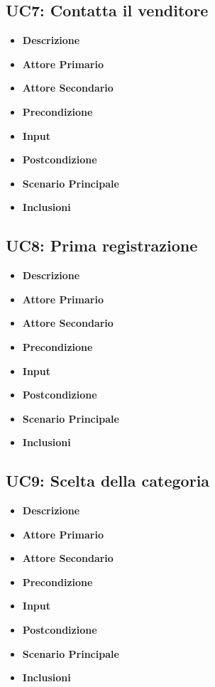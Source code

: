         \subsection{UC7: Contatta il venditore}
        \begin{itemize}
            \item \textbf{Descrizione}
            \item \textbf{Attore Primario}
            \item \textbf{Attore Secondario}
            \item \textbf{Precondizione}
            \item \textbf{Input}
            \item \textbf{Postcondizione}
            \item \textbf{Scenario Principale}
            \item \textbf{Inclusioni}
        \end{itemize}
        \subsection{UC8: Prima registrazione}
        \begin{itemize}
            \item \textbf{Descrizione}
            \item \textbf{Attore Primario}
            \item \textbf{Attore Secondario}
            \item \textbf{Precondizione}
            \item \textbf{Input}
            \item \textbf{Postcondizione}
            \item \textbf{Scenario Principale}
            \item \textbf{Inclusioni}
        \end{itemize}
        \subsection{UC9: Scelta della categoria}
        \begin{itemize}
            \item \textbf{Descrizione}
            \item \textbf{Attore Primario}
            \item \textbf{Attore Secondario}
            \item \textbf{Precondizione}
            \item \textbf{Input}
            \item \textbf{Postcondizione}
            \item \textbf{Scenario Principale}
            \item \textbf{Inclusioni}
        \end{itemize}

